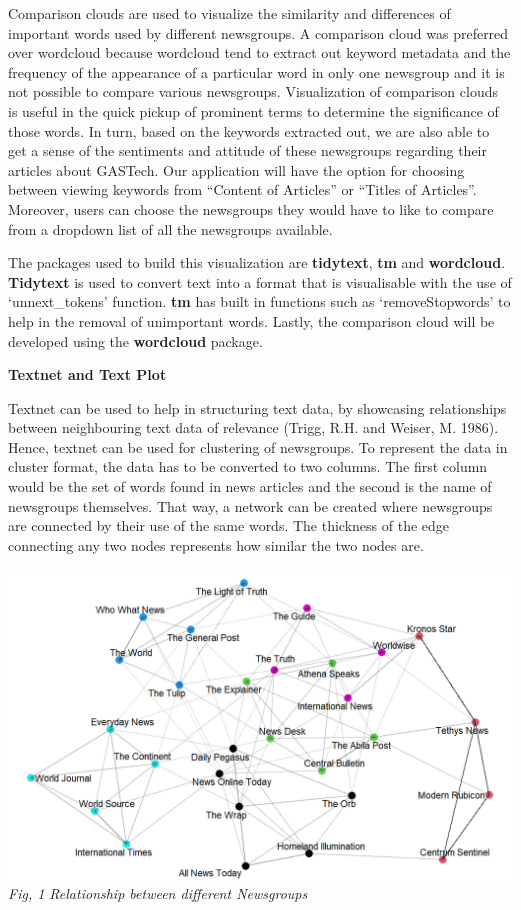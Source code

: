 \documentclass{acm_proc_article-sp}
\begin{document}
Comparison clouds are used to visualize the similarity and differences
of important words used by different newsgroups. A comparison cloud was
preferred over wordcloud because wordcloud tend to extract out keyword
metadata and the frequency of the appearance of a particular word in
only one newsgroup and it is not possible to compare various newsgroups.
Visualization of comparison clouds is useful in the quick pickup of
prominent terms to determine the significance of those words. In turn,
based on the keywords extracted out, we are also able to get a sense of
the sentiments and attitude of these newsgroups regarding their articles
about GASTech. Our application will have the option for choosing between
viewing keywords from ``Content of Articles'' or ``Titles of Articles''.
Moreover, users can choose the newsgroups they would have to like to
compare from a dropdown list of all the newsgroups available.

The packages used to build this visualization are \textbf{tidytext},
\textbf{tm} and \textbf{wordcloud}. \textbf{Tidytext} is used to convert
text into a format that is visualisable with the use of `unnext\_tokens'
function. \textbf{tm} has built in functions such as `removeStopwords'
to help in the removal of unimportant words. Lastly, the comparison
cloud will be developed using the \textbf{wordcloud} package.

\textbf{Textnet and Text Plot}

Textnet can be used to help in structuring text data, by showcasing
relationships between neighbouring text data of relevance (Trigg, R.H.
and Weiser, M. 1986). Hence, textnet can be used for clustering of
newsgroups. To represent the data in cluster format, the data has to be
converted to two columns. The first column would be the set of words
found in news articles and the second is the name of newsgroups
themselves. That way, a network can be created where newsgroups are
connected by their use of the same words. The thickness of the edge
connecting any two nodes represents how similar the two nodes are.

\includegraphics{img/image02.png} \emph{Fig, 1 Relationship between
different Newsgroups}
\end{document}

